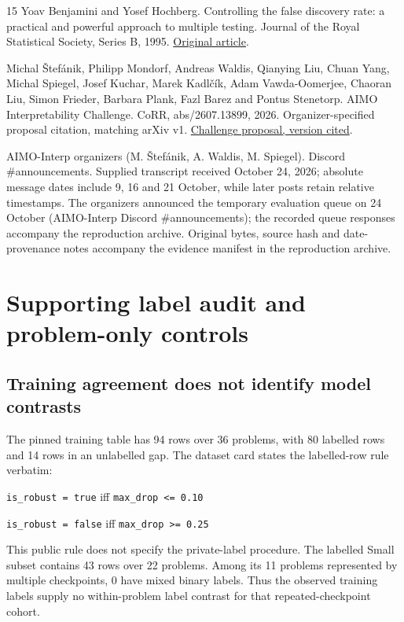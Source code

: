 \begin{thebibliography}{15}
 Yoav Benjamini and Yosef Hochberg. Controlling the false discovery rate: a practical and powerful approach to multiple testing. Journal of the Royal Statistical Society, Series B, 1995. \href{https://doi.org/10.1111/j.2517-6161.1995.tb02031.x}{Original article}.

 Michal Štefánik, Philipp Mondorf, Andreas Waldis, Qianying Liu, Chuan Yang, Michal Spiegel, Josef Kuchar, Marek Kadlčík, Adam Vawda-Oomerjee, Chaoran Liu, Simon Frieder, Barbara Plank, Fazl Barez and Pontus Stenetorp. AIMO Interpretability Challenge. CoRR, abs/2607.13899, 2026. Organizer-specified proposal citation, matching arXiv v1. \href{https://arxiv.org/abs/2607.13899v1}{Challenge proposal, version cited}.

 AIMO-Interp organizers (M. Štefánik, A. Waldis, M. Spiegel). Discord \#announcements. Supplied transcript received October 24, 2026; absolute message dates include 9, 16 and 21 October, while later posts retain relative timestamps. The organizers announced the temporary evaluation queue on 24 October (AIMO-Interp Discord \#announcements); the recorded queue responses accompany the reproduction archive. Original bytes, source hash and date-provenance notes accompany the evidence manifest in the reproduction archive.

\end{thebibliography}

\clearpage

\appendix

\section{Supporting label audit and problem-only controls}

\subsection{Training agreement does not identify model contrasts}

The pinned training table has 94 rows over 36 problems, with 80 labelled rows and 14 rows in an unlabelled gap. The dataset card states the labelled-row rule verbatim:


\texttt{is\_\allowbreak robust = true}  iff \texttt{max\_\allowbreak drop <= 0.10}


\texttt{is\_\allowbreak robust = false} iff \texttt{max\_\allowbreak drop >= 0.25}


This public rule does not specify the private-label procedure. The labelled Small subset contains 43 rows over 22 problems. Among its 11 problems represented by multiple checkpoints, 0 have mixed binary labels. Thus the observed training labels supply no within-problem label contrast for that repeated-checkpoint cohort. \citep{S2}


